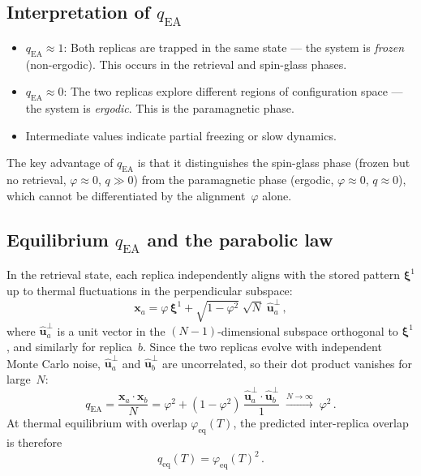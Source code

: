 \documentclass[11pt]{article}
\begin{document}
\subsection{Interpretation of $q_{\mathrm{EA}}$}

\begin{itemize}
    \item $q_{\mathrm{EA}} \approx 1$: Both replicas are trapped in the same state --- the system is \emph{frozen} (non-ergodic). This occurs in the retrieval and spin-glass phases.
    \item $q_{\mathrm{EA}} \approx 0$: The two replicas explore different regions of configuration space --- the system is \emph{ergodic}. This is the paramagnetic phase.
    \item Intermediate values indicate partial freezing or slow dynamics.
\end{itemize}

The key advantage of $q_{\mathrm{EA}}$ is that it distinguishes the spin-glass phase (frozen but no retrieval, $\varphi \approx 0$, $q \gg 0$) from the paramagnetic phase (ergodic, $\varphi \approx 0$, $q \approx 0$), which cannot be differentiated by the alignment~$\varphi$ alone.

\subsection{Equilibrium $q_{\mathrm{EA}}$ and the parabolic law}
\label{sec:q-parabolic}

In the retrieval state, each replica independently aligns with the stored pattern $\boldsymbol{\xi}^1$ up to thermal fluctuations in the perpendicular subspace:
\begin{equation}\label{eq:replica-decomp}
    \mathbf{x}_{a} = \varphi\, \boldsymbol{\xi}^1 + \sqrt{1 - \varphi^2}\;\sqrt{N}\;\hat{\mathbf{u}}_{a}^{\perp}\,,
\end{equation}
where $\hat{\mathbf{u}}_{a}^{\perp}$ is a unit vector in the $(N\!-\!1)$-dimensional subspace orthogonal to $\boldsymbol{\xi}^1$, and similarly for replica~$b$. Since the two replicas evolve with independent Monte Carlo noise, $\hat{\mathbf{u}}_{a}^{\perp}$ and $\hat{\mathbf{u}}_{b}^{\perp}$ are uncorrelated, so their dot product vanishes for large~$N$:
\begin{equation}
    q_{\mathrm{EA}} = \frac{\mathbf{x}_a \!\cdot\! \mathbf{x}_b}{N}
    = \varphi^2 + (1-\varphi^2)\,\frac{\hat{\mathbf{u}}_a^{\perp}\!\cdot\!\hat{\mathbf{u}}_b^{\perp}}{1}
    \;\xrightarrow{N\to\infty}\; \varphi^2\,.
\end{equation}
At thermal equilibrium with overlap $\varphi_{\mathrm{eq}}(T)$, the predicted inter-replica overlap is therefore
\begin{equation}\label{eq:q-eq}
    q_{\mathrm{eq}}(T) = \varphi_{\mathrm{eq}}(T)^2\,.
\end{equation}
\end{document}
